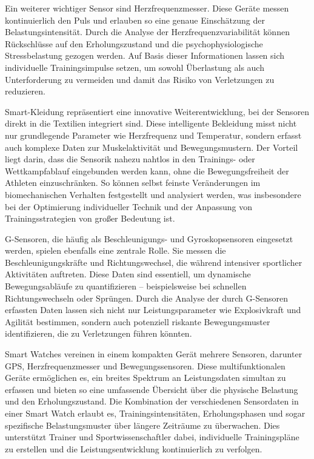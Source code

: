 \documentclass[
  number]{elsarticle}
\begin{document}
Ein weiterer wichtiger Sensor sind Herzfrequenzmesser. Diese Geräte
messen kontinuierlich den Puls und erlauben so eine genaue Einschätzung
der Belastungsintensität. Durch die Analyse der Herzfrequenzvariabilität
können Rückschlüsse auf den Erholungszustand und die
psychophysiologische Stressbelastung gezogen werden. Auf Basis dieser
Informationen lassen sich individuelle Trainingsimpulse setzen, um
sowohl Überlastung als auch Unterforderung zu vermeiden und damit das
Risiko von Verletzungen zu reduzieren.
\citep[pp.~29--35]{memmert_sporttechnologie}

Smart-Kleidung repräsentiert eine innovative Weiterentwicklung, bei der
Sensoren direkt in die Textilien integriert sind. Diese intelligente
Bekleidung misst nicht nur grundlegende Parameter wie Herzfrequenz und
Temperatur, sondern erfasst auch komplexe Daten zur Muskelaktivität und
Bewegungsmustern. Der Vorteil liegt darin, dass die Sensorik nahezu
nahtlos in den Trainings- oder Wettkampfablauf eingebunden werden kann,
ohne die Bewegungsfreiheit der Athleten einzuschränken. So können selbst
feinste Veränderungen im biomechanischen Verhalten festgestellt und
analysiert werden, was insbesondere bei der Optimierung individueller
Technik und der Anpassung von Trainingsstrategien von großer Bedeutung
ist. \citep[pp.~29--35]{memmert_sporttechnologie}

G-Sensoren, die häufig als Beschleunigungs- und Gyroskopsensoren
eingesetzt werden, spielen ebenfalls eine zentrale Rolle. Sie messen die
Beschleunigungskräfte und Richtungswechsel, die während intensiver
sportlicher Aktivitäten auftreten. Diese Daten sind essentiell, um
dynamische Bewegungsabläufe zu quantifizieren -- beispielsweise bei
schnellen Richtungswechseln oder Sprüngen. Durch die Analyse der durch
G-Sensoren erfassten Daten lassen sich nicht nur Leistungsparameter wie
Explosivkraft und Agilität bestimmen, sondern auch potenziell riskante
Bewegungsmuster identifizieren, die zu Verletzungen führen könnten.
\citep[pp.~29--35]{memmert_sporttechnologie}

Smart Watches vereinen in einem kompakten Gerät mehrere Sensoren,
darunter GPS, Herzfrequenzmesser und Bewegungssensoren. Diese
multifunktionalen Geräte ermöglichen es, ein breites Spektrum an
Leistungsdaten simultan zu erfassen und bieten so eine umfassende
Übersicht über die physische Belastung und den Erholungszustand. Die
Kombination der verschiedenen Sensordaten in einer Smart Watch erlaubt
es, Trainingsintensitäten, Erholungsphasen und sogar spezifische
Belastungsmuster über längere Zeiträume zu überwachen. Dies unterstützt
Trainer und Sportwissenschaftler dabei, individuelle Trainingspläne zu
erstellen und die Leistungsentwicklung kontinuierlich zu verfolgen.
\citep[pp.~29--35]{memmert_sporttechnologie}
\end{document}
